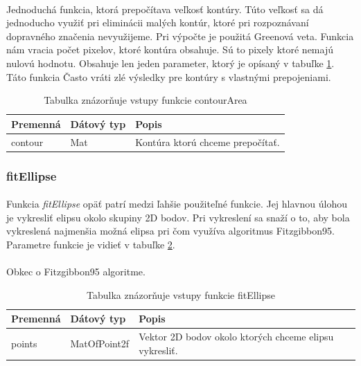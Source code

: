 \documentclass[12pt]{article}
\begin{document}
\paragraph{}
Jednoduchá funkcia, ktorá prepočítava veľkosť kontúry.
Túto veľkosť sa dá jednoducho využiť pri eliminácii malých kontúr, ktoré pri rozpoznávaní dopravného značenia nevyužijeme.
Pri výpočte je použitá Greenová veta. Funkcia nám vracia počet pixelov, ktoré kontúra obsahuje. Sú to pixely ktoré nemajú nulovú hodnotu.
Obsahuje len jeden parameter, ktorý je opísaný v tabuľke \ref{contourAreaPar}. Táto funkcia Často vráti zlé výsledky pre kontúry s vlastnými prepojeniami.
\cite{OpenCVDoc}
\begin{table}
	\centering
    \begin{tabular}{ | l | l | p{5cm} |}
    \hline
    Premenná & Dátový typ & Popis \\ \hline
    contour & Mat & Kontúra ktorú chceme prepočítať. \\ 
    \hline
    \end{tabular}
  	\caption{Tabulka znázorňuje vstupy funkcie contourArea}
  	\label{contourAreaPar}
\end{table}
\subsubsection{fitEllipse}
\paragraph{}
Funkcia \emph{fitEllipse} opäť patrí medzi ľahšie použiteľné funkcie. Jej hlavnou úlohou je vykresliť elipsu okolo skupiny 2D bodov.
Pri vykreslení sa snaží o to, aby bola vykreslená najmenšia možná elipsa pri čom využíva algoritmus Fitzgibbon95.
Parametre funkcie je vidieť v tabuľke \ref{fitEllipsePar}.
\paragraph{}
Obkec o Fitzgibbon95 algoritme.
\cite{OpenCVDoc}
\begin{table}
	\centering
    \begin{tabular}{ | l | l | p{5cm} |}
    \hline
    Premenná & Dátový typ & Popis \\ \hline
    points & MatOfPoint2f & Vektor 2D bodov okolo ktorých chceme elipsu vykresliť. \\ 
    \hline
    \end{tabular}
  	\caption{Tabulka znázorňuje vstupy funkcie fitEllipse}
  	\label{fitEllipsePar}
\end{table}
\end{document}
